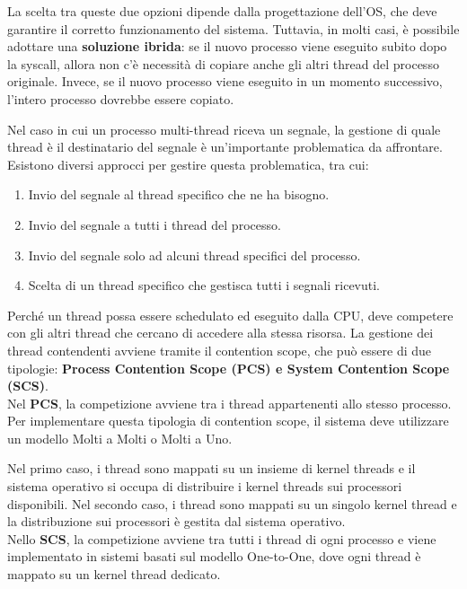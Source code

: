 \documentclass{article}
\begin{document}
    La scelta tra queste due opzioni dipende dalla progettazione dell'OS, che deve garantire il corretto funzionamento del sistema. Tuttavia, in molti casi, è possibile adottare una \textbf{soluzione ibrida}: se il nuovo processo viene eseguito subito dopo la syscall, allora non c'è necessità di copiare anche gli altri thread del processo originale. Invece, se il nuovo processo viene eseguito in un momento successivo, l'intero processo dovrebbe essere copiato.
    
    Nel caso in cui un processo multi-thread riceva un segnale, la gestione di quale thread è il destinatario del segnale è un'importante problematica da affrontare. Esistono diversi approcci per gestire questa problematica, tra cui:
    \begin{enumerate}
        \item Invio del segnale al thread specifico che ne ha bisogno.
        \item Invio del segnale a tutti i thread del processo.
        \item Invio del segnale solo ad alcuni thread specifici del processo.
        \item Scelta di un thread specifico che gestisca tutti i segnali ricevuti.
    \end{enumerate}
\pagebreak
    Perché un thread possa essere schedulato ed eseguito dalla CPU, deve competere con gli altri thread che cercano di accedere alla stessa risorsa. La gestione dei thread contendenti avviene tramite il contention scope, che può essere di due tipologie: \textbf{Process Contention Scope (PCS) {e} System Contention Scope (SCS)}.\\

    Nel \textbf{PCS}, la competizione avviene tra i thread appartenenti allo stesso processo. Per implementare questa tipologia di contention scope, il sistema deve utilizzare un modello Molti a Molti o Molti a Uno.\par Nel primo caso, i thread sono mappati su un insieme di kernel threads e il sistema operativo si occupa di distribuire i kernel threads sui processori disponibili. Nel secondo caso, i thread sono mappati su un singolo kernel thread e la distribuzione sui processori è gestita dal sistema operativo.\\
    
    Nello \textbf{SCS}, la competizione avviene tra tutti i thread di ogni processo e viene implementato in sistemi basati sul modello One-to-One, dove ogni thread è mappato su un kernel thread dedicato.\\
    
\end{document}
